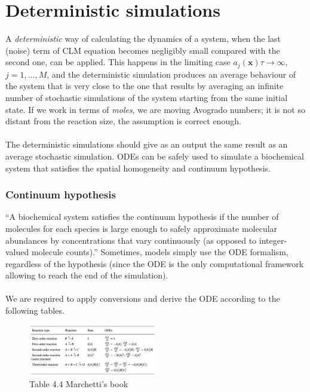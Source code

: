 \graphicspath{{chapters/05/images/}}
\chapter{Deterministic simulations}
A \emph{deterministic} way of calculating the dynamics of a system, when the last (noise) term of CLM equation becomes negligibly small compared with the second one, can be applied.
This happens in the limiting case $a_j(\mathbf{x})\tau → \infty$, $j = 1,...,M$, and the deterministic simulation produces an average behaviour of the system that is very close to the one that results by averaging an infinite number of stochastic simulations of the system starting from the same initial state.
If we work in terms of \emph{moles}, we are moving Avogrado numbers; it is not so distant from the reaction size, the assumption is correct enough.
\\
\\
\noindent
The deterministic simulations should give as an output the same result as an average stochastic simulation.
ODEs can be safely used to simulate a biochemical system that satisfies the spatial homogeneity and continuum hypothesis.
\subsection{Continuum hypothesis} 
``A biochemical system satisfies the continuum hypothesis if the number of molecules for each species is large enough to safely approximate molecular abundances by concentrations that vary continuously (as opposed to integer- valued molecule counts).''
Sometimes, models simply use the ODE formalism, regardless of the hypothesis (since the ODE is the only computational framework allowing to reach the end of the simulation).
\\
\\
\noindent
We are required to apply conversions and derive the ODE according to the following tables.

\begin{figure}
  \centering
  \includegraphics[width=0.5\textwidth]{reaction_ODEs.png}
  \caption{Table 4.4 Marchetti's book}
  \label{fig:rec_ODE}
\end{figure}

